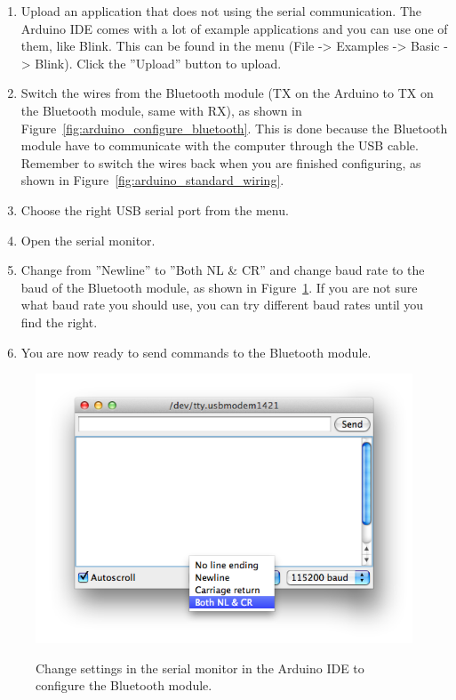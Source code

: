 		\begin{enumerate}
		\item Upload an application that does not using the serial communication. The Arduino IDE comes with a lot of example applications and you can use one of them, like Blink. This can be found in the menu (File -> Examples -> Basic -> Blink). Click the ''Upload'' button to upload.
		
		\item Switch the wires from the Bluetooth module (TX on the Arduino to TX on the Bluetooth module, same with RX), as shown in Figure~\ref{fig:arduino_configure_bluetooth}. This is done because the Bluetooth module have to communicate with the computer through the USB cable. Remember to switch the wires back when you are finished configuring, as shown in Figure~\ref{fig:arduino_standard_wiring}.
		
		\item Choose the right USB serial port from the menu.
		
		\item Open the serial monitor.
		
		\item Change from ''Newline'' to ''Both NL \& CR'' and change baud rate to the baud of the Bluetooth module, as shown in Figure~\ref{fig:serial_monitor}. If you are not sure what baud rate you should use, you can try different baud rates until you find the right.
		
		\item You are now ready to send commands to the Bluetooth module.
		\end{enumerate}
		
		\begin{figure}[H]
			\centering
			\includegraphics[scale=0.5]{images/serial_monitor.png}
			\label{fig:serial_monitor}
			\caption{Change settings in the serial monitor in the Arduino IDE to configure the Bluetooth module.}
		\end{figure}
		
